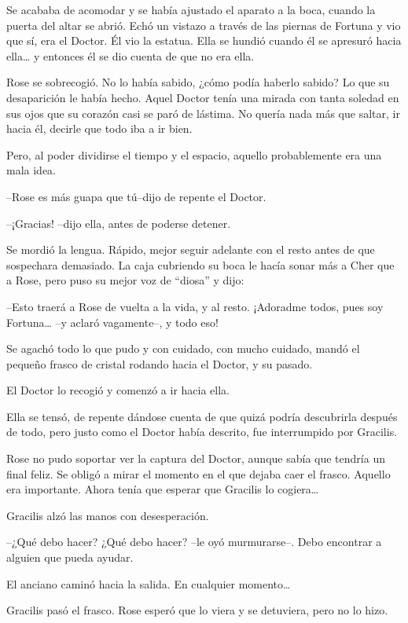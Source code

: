Se acababa de acomodar y se había ajustado el aparato a la boca, cuando
la puerta del altar se abrió. Echó un vistazo a través de las piernas de
Fortuna y vio que sí, era el Doctor. Él vio la estatua. Ella se hundió
cuando él se apresuró hacia ella\ldots{} y entonces él se dio cuenta de
que no era ella.

Rose se sobrecogió. No lo había sabido, ¿cómo podía haberlo sabido? Lo
que su desaparición le había hecho. Aquel Doctor tenía una mirada con
tanta soledad en sus ojos que su corazón casi se paró de lástima. No
quería nada más que saltar, ir hacia él, decirle que todo iba a ir bien.

Pero, al poder dividirse el tiempo y el espacio, aquello probablemente
era una mala idea.

--Rose es más guapa que tú--dijo de repente el Doctor.

--¡Gracias! --dijo ella, antes de poderse detener.

Se mordió la lengua. Rápido, mejor seguir adelante con el resto antes de
que sospechara demasiado. La caja cubriendo su boca le hacía sonar más a
Cher que a Rose, pero puso su mejor voz de ``diosa'' y dijo:

--Esto traerá a Rose de vuelta a la vida, y al resto. ¡Adoradme todos,
pues soy Fortuna\ldots{} --y aclaró vagamente--, y todo eso!

Se agachó todo lo que pudo y con cuidado, con mucho cuidado, mandó el
pequeño frasco de cristal rodando hacia el Doctor, y su pasado.

El Doctor lo recogió y comenzó a ir hacia ella.

Ella se tensó, de repente dándose cuenta de que quizá podría descubrirla
después de todo, pero justo como el Doctor había descrito, fue
interrumpido por Gracilis.

Rose no pudo soportar ver la captura del Doctor, aunque sabía que
tendría un final feliz. Se obligó a mirar el momento en el que dejaba
caer el frasco. Aquello era importante. Ahora tenía que esperar que
Gracilis lo cogiera\ldots{}

Gracilis alzó las manos con desesperación.

--¿Qué debo hacer? ¿Qué debo hacer? --le oyó murmurarse--. Debo
encontrar a alguien que pueda ayudar.

El anciano caminó hacia la salida. En cualquier momento\ldots{}

Gracilis pasó el frasco. Rose esperó que lo viera y se detuviera, pero
no lo hizo.

